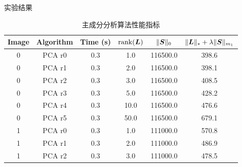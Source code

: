 \documentclass{beamer}
\begin{document}
\begin{frame}{实验结果}
  \begin{table}[!htbp]
    \centering
    \small
    \caption{主成分分析算法性能指标}
    \label{tab:pca_index}
    \begin{tabular}{cccccc}
      \toprule
      Image & Algorithm     & Time (s)  & $\operatorname{rank}(\bm{L})$ & $\|\bm{S}\|_0$  & $\|\bm{L}\|_{*}+\lambda\|\bm{S}\|_{m_1}$ \\
      \midrule
      0     & PCA r0    & 0.3      & 1.0         & 116500.0    & 398.6         \\
      0     & PCA r1    & 0.3      & 2.0         & 116500.0    & 398.1         \\
      0     & PCA r2    & 0.3      & 3.0         & 116500.0    & 408.5         \\
      0     & PCA r3    & 0.3      & 5.0         & 116500.0    & 428.2         \\
      0     & PCA r4    & 0.3      & 10.0        & 116500.0    & 476.6         \\
      0     & PCA r5    & 0.3      & 50.0        & 116500.0    & 679.1         \\
      1     & PCA r0    & 0.3      & 1.0         & 111000.0    & 570.8         \\
      1     & PCA r1    & 0.3      & 2.0         & 111000.0    & 486.9         \\
      1     & PCA r2    & 0.3      & 3.0         & 111000.0    & 478.5         \\
      \bottomrule
    \end{tabular}
  \end{table}
\end{frame}
\end{document}
